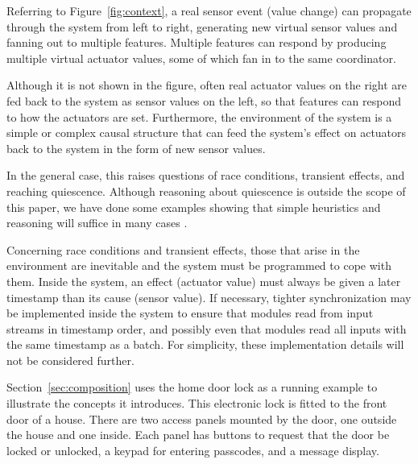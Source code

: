 \documentclass[conference]{IEEEtran}
\begin{document}
Referring to Figure~\ref{fig:context},
a real sensor event (value change) can propagate through the system from
left to right, generating new virtual sensor values and fanning out to
multiple features.
Multiple features can respond by producing multiple virtual actuator
values, some of which fan in to the same coordinator.

Although it is not shown in the figure, often real actuator values on
the right are fed back to the system as sensor values on the left,
so that features can respond to how the actuators are set.
Furthermore,
the environment of the system is a simple or complex causal structure that
can feed the system's effect on actuators back to the system in the
form of new sensor values.

In the general case, this raises questions of race conditions, transient
effects, and reaching quiescence.
Although reasoning about quiescence is outside the scope of this paper,
we have done some examples showing that simple heuristics and reasoning
will suffice in many cases \cite{pfcTR}.

Concerning race conditions and transient effects, those that arise
in the environment are inevitable and the system must be programmed to
cope with them.
Inside the system, an effect (actuator value) must always be given a
later timestamp than its cause (sensor value).
If necessary, tighter synchronization may be implemented inside
the system to ensure
that modules read from input streams in timestamp order, and possibly
even that modules read all inputs with the same timestamp as a batch.
For simplicity, these implementation details will not be considered
further.

Section~\ref{sec:composition} uses the home door lock as a running
example to illustrate the concepts it introduces.
This electronic lock is fitted to the front door of a house.
There are two access panels mounted by the door, one outside the house 
and one inside.
Each panel has buttons to request that the door be locked or unlocked,
a keypad for entering passcodes, and a message display.
\end{document}

